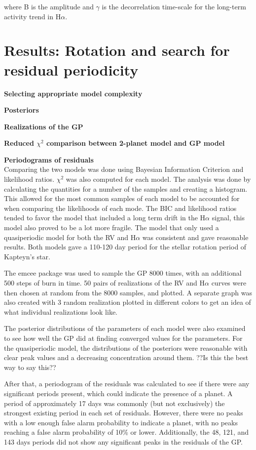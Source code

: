 \documentclass{aastex6}
\begin{document}
 where B is the amplitude and $\gamma$ is the decorrelation time-scale for the long-term activity trend in H$\alpha$.


\section{Results: Rotation and search for residual periodicity}\label{sec:results}

\textbf{Selecting appropriate model complexity}

\textbf{Posteriors}

\textbf{Realizations of the GP}

\textbf{Reduced $\chi^2$ comparison between 2-planet model and GP model}

\textbf{Periodograms of residuals}\\

Comparing the two models was done using Bayesian Information Criterion and likelihood ratios. $\chi^2$ was also computed for each model. The analysis was done by calculating the quantities for a number of the samples and creating a histogram. This allowed for the most common samples of each model to be accounted for when comparing the likelihoods of each mode. The BIC and likelihood ratios tended to favor the model that included a long term drift in the H$\alpha$ signal, this model also proved to be a lot more fragile. The model that only used a quasiperiodic model for both the RV and H$\alpha$ was consistent and gave reasonable results. Both models gave a 110-120 day period for the stellar rotation period of Kapteyn's  star.

The emcee package was used to sample the GP 8000 times, with an additional 500 steps of burn in time. 50 pairs of realizations of the RV and H$\alpha$ curves were then chosen at random from the 8000 samples, and plotted. A separate graph was also created with 3 random realization plotted in different colors to get an idea of what individual realizations look like. 

The posterior distributions of the parameters of each model were also examined to see how well the GP did at finding converged values for the parameters. For the quasiperiodic model, the distributions of the posteriors were reasonable with clear peak values and a decreasing concentration around them. \xleftarrow{}  ??Is this the best way to say this?? 

After that, a periodogram of the residuals was calculated to see if there were any significant periods present, which could indicate the presence of a planet. A period of approximately 17 days was commonly (but not exclusively) the strongest existing period in each set of residuals. However, there were no peaks with a low enough false alarm probability to indicate a planet, with no peaks reaching a false alarm probability of 10\% or lower. Additionally, the 48, 121, and 143 days periods did not show any significant peaks in the residuals of the GP.
\end{document}
